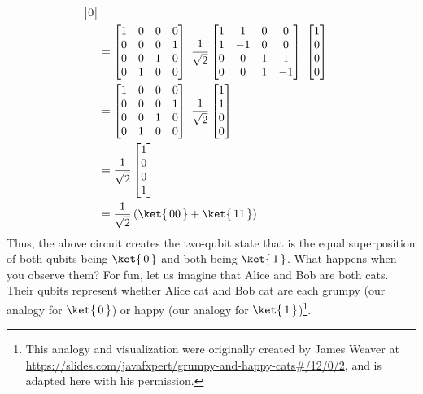 \documentclass{article}
\theoremstyle{definition}
\newcommand{\kz}[1]{\ket{\,#1\,}}
\begin{document}
\begin{align}
\begin{bmatrix}
		0
	\end{bmatrix}\\
	&= \begin{bmatrix}
		1 & 0 & 0 & 0\\
		0 & 0 & 0 & 1\\
		0 & 0 & 1 & 0\\
		0 & 1 & 0 & 0
	\end{bmatrix} \ \frac{1}{\sqrt{2}}\begin{bmatrix}
			1 & 1 & 0 & 0\\
			1 & -1 & 0 & 0\\
			0 & 0 & 1 & 1\\
			0 & 0 & 1 & -1
		\end{bmatrix} \ \begin{bmatrix}
		1\\
		0\\
		0\\
		0
	\end{bmatrix}\\
	&= \begin{bmatrix}
		1 & 0 & 0 & 0\\
		0 & 0 & 0 & 1\\
		0 & 0 & 1 & 0\\
		0 & 1 & 0 & 0
	\end{bmatrix} \ \frac{1}{\sqrt{2}}\begin{bmatrix}
			1\\
			1\\
			0\\
			0
		\end{bmatrix}\\
	&= \frac{1}{\sqrt{2}}\begin{bmatrix}
			1\\
			0\\
			0\\
			1
		\end{bmatrix}\\
	&= \frac{1}{\sqrt{2}} \left( \kz{00} + \kz{11} \right)
\end{align}
Thus, the above circuit creates the two-qubit state that is the equal superposition of both qubits being $\kz0$ and both being $\kz1$.
What happens when you observe them?
For fun, let us imagine that Alice and Bob are both cats.  Their qubits represent whether Alice cat and Bob cat are each grumpy (our analogy for $\kz0$) or happy (our analogy for $\kz1$)\footnote{This analogy and visualization were originally created by James Weaver at \url{https://slides.com/javafxpert/grumpy-and-happy-cats\#/12/0/2}, and is adapted here with his permission.}.
\end{document}

